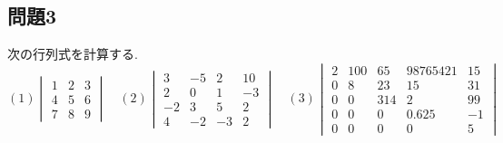\documentclass[a4j,dvipdfmx]{jsarticle}
\begin{document}
    \subsection*{問題3}
        次の行列式を計算する.
        \begin{equation*}
            (1)\begin{vmatrix}
                1 & 2 & 3 \\
                4 & 5 & 6\\
                7 & 8 & 9
            \end{vmatrix}\quad
            (2)\begin{vmatrix}
                3 & -5 & 2 & 10\\
                2 & 0 & 1 & -3\\
                -2 & 3 & 5 & 2\\
                4 & -2 & -3 & 2
            \end{vmatrix}\quad
            (3)\begin{vmatrix}
                2 & 100 & 65 & 98765421 & 15\\
                0 & 8 & 23 & 15 & 31\\
                0 & 0 & 314 & 2 & 99\\
                0 & 0 & 0 & 0.625 & -1\\
                0 & 0 & 0 & 0 &  5
            \end{vmatrix}
        \end{equation*}
\end{document}
